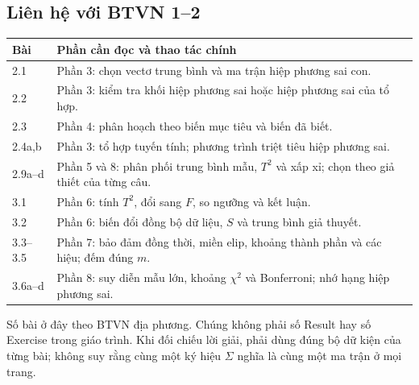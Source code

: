 \subsection{Liên hệ với BTVN 1--2}
\begin{center}
\small
\begin{tabular}{lp{.68\linewidth}}
\toprule
Bài & Phần cần đọc và thao tác chính\\
\midrule
2.1 & Phần 3: chọn vectơ trung bình và ma trận hiệp phương sai con.\\
2.2 & Phần 3: kiểm tra khối hiệp phương sai hoặc hiệp phương sai của tổ hợp.\\
2.3 & Phần 4: phân hoạch theo biến mục tiêu và biến đã biết.\\
2.4a,b & Phần 3: tổ hợp tuyến tính; phương trình triệt tiêu hiệp phương sai.\\
2.9a--d & Phần 5 và 8: phân phối trung bình mẫu, $T^2$ và xấp xỉ; chọn theo giả thiết của từng câu.\\
3.1 & Phần 6: tính $T^2$, đổi sang $F$, so ngưỡng và kết luận.\\
3.2 & Phần 6: biến đổi đồng bộ dữ liệu, $S$ và trung bình giả thuyết.\\
3.3--3.5 & Phần 7: bảo đảm đồng thời, miền elip, khoảng thành phần và các hiệu; đếm đúng $m$.\\
3.6a--d & Phần 8: suy diễn mẫu lớn, khoảng $\chi^2$ và Bonferroni; nhớ hạng hiệp phương sai.\\
\bottomrule
\end{tabular}
\end{center}
Số bài ở đây theo BTVN địa phương. Chúng không phải số Result hay số
Exercise trong giáo trình. Khi đối chiếu lời giải, phải dùng đúng bộ dữ
kiện của từng bài; không suy rằng cùng một ký hiệu $\Sigma$ nghĩa là cùng
một ma trận ở mọi trang.

